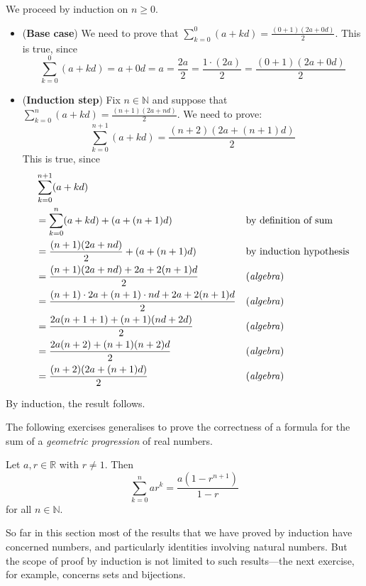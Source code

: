 \begin{cproof}
We proceed by induction on $n \ge 0$.
\begin{itemize}
\item (\textbf{Base case}) We need to prove that $\displaystyle\sum_{k=0}^0 (a+kd) = \frac{(0+1)(2a+0d)}{2}$. This is true, since
\[ \sum_{k=0}^0 (a+kd) = a + 0d = a = \frac{2a}{2} = \frac{1 \cdot (2a)}{2} = \frac{(0+1)(2a+0d)}{2} \]

\item (\textbf{Induction step}) Fix $n \in \mathbb{N}$ and suppose that $\displaystyle\sum_{k=0}^n (a+kd) = \frac{(n+1)(2a+nd)}{2}$. We need to prove:
\[ \sum_{k=0}^{n+1} (a+kd) = \frac{(n+2)(2a+(n+1)d)}{2} \]
This is true, since
\begin{align*}
&\sum_{k=0}^{n+1} (a+kd) && \\
&= \sum_{k=0}^n (a+kd) + (a+(n+1)d) && \text{by definition of sum} \\
&= \frac{(n+1)(2a+nd)}{2} + (a + (n+1)d) && \text{by induction hypothesis} \\
&= \frac{(n+1)(2a+nd) + 2a + 2(n+1)d}{2} && \text{(\textit{algebra})} \\
&= \frac{(n+1) \cdot 2a + (n+1) \cdot nd + 2a + 2(n+1)d}{2} && \text{(\textit{algebra})} \\
&= \frac{2a(n+1+1) + (n+1)(nd + 2d)}{2} && \text{(\textit{algebra})} \\
&= \frac{2a(n+2) + (n+1)(n+2)d}{2} && \text{(\textit{algebra})} \\
&= \frac{(n+2)(2a + (n+1)d)}{2} && \text{(\textit{algebra})}
\end{align*}
\end{itemize}
By induction, the result follows.
\end{cproof}

The following exercises generalises  to prove the correctness of a formula for the sum of a \textit{geometric progression} of real numbers.

\begin{exercise}
\label{exFormulaForGeometricProgression}
Let $a,r \in \mathbb{R}$ with $r \ne 1$. Then
\[ \sum_{k=0}^n ar^k = \frac{a(1-r^{n+1})}{1-r} \]
for all $n \in \mathbb{N}$.
\end{exercise}

So far in this section most of the results that we have proved by induction have concerned numbers, and particularly identities involving natural numbers. But the scope of proof by induction is not limited to such results---the next exercise, for example, concerns sets and bijections.

